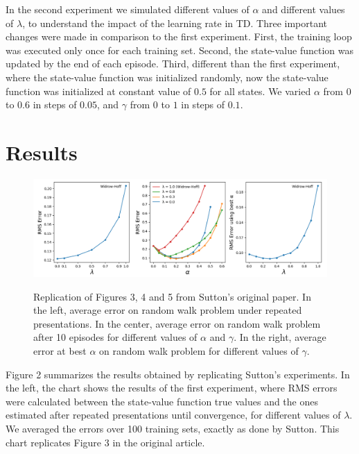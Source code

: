 \documentclass{article}
\begin{document}
    In the second experiment we simulated different values of $\alpha$ and different values of $\lambda$, to understand the impact of the learning rate in TD.
    Three important changes were made in comparison to the first experiment.
    First, the training loop was executed only once for each training set.
    Second, the state-value function was updated by the end of each episode.
    Third, different than the first experiment, where the state-value function was initialized randomly, now the state-value function was initialized at constant value of $0.5$ for all states.
    We varied $\alpha$ from $0$ to $0.6$ in steps of $0.05$, and $\gamma$ from $0$
    to $1$ in steps of $0.1$.


    \section{Results}
    \label{sec:results}

    \begin{figure}[t]
        \includegraphics[width=\textwidth]{../images/figure.png}
        \centering
        \label{fig:fig2}
        \caption{Replication of Figures 3, 4 and 5 from Sutton's original paper.
        In the left, average error on random walk problem under repeated presentations.
        In the center, average error on random walk problem after 10 episodes for different values of $\alpha$ and $\gamma$.
        In the right, average error at best $\alpha$ on random walk problem for different values of $\gamma$.}
    \end{figure}

    Figure 2 summarizes the results obtained by replicating Sutton's experiments.
    In the left, the chart shows the results of the first experiment, where RMS errors were calculated between the state-value function true values and the ones estimated after repeated presentations until convergence, for different values of $\lambda$.
    We averaged the errors over 100 training sets, exactly as done by Sutton.
    This chart replicates Figure 3 in the original article.
\end{document}
